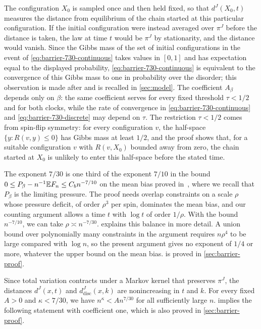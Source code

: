 The configuration $X_0$ is sampled once and then held fixed, so that
$d^J(X_0,t)$ measures the distance from equilibrium of the chain started at
this particular configuration. If the initial configuration were instead
averaged over $\pi^J$ before the distance is taken, the law at time $t$
would be $\pi^J$ by stationarity, and the distance would vanish. Since the
Gibbs mass of the set of initial configurations in the event of
\eqref{eq:barrier-730-continuous} takes values in $[0,1]$ and has expectation
equal to the displayed probability, \eqref{eq:barrier-730-continuous} is
equivalent to the convergence of this Gibbs mass to one in probability over
the disorder; this observation is made after
\cite[Theorem~1.1]{oai-barriers} and is recalled in \cref{sec:model}. The
coefficient $A_\beta$ depends only on $\beta$: the same coefficient serves
for every fixed threshold $\tau<1/2$ and for both clocks, while the rate of
convergence in \eqref{eq:barrier-730-continuous} and
\eqref{eq:barrier-730-discrete} may depend on $\tau$. The restriction
$\tau<1/2$ comes from spin-flip symmetry: for every configuration $v$, the
half-space $\{y:R(v,y)\le0\}$ has Gibbs mass at least $1/2$, and the proof
shows that, for a suitable configuration $v$ with $R(v,X_0)$ bounded away
from zero, the chain started at $X_0$ is unlikely to enter this half-space
before the stated time.

The exponent $7/30$ is one third of the exponent $7/10$ in the bound
$0\le P_\beta-n^{-1}\mathbb E F_n\le C_b n^{-7/10}$ on the mean bias
proved in~\cite[Theorem~1.1]{hexagon-bias}, where
we recall that $P_\beta$ is the limiting pressure. The proof needs overlap constraints on a scale
$\rho$ whose pressure deficit, of order $\rho^3$ per spin, dominates the
mean bias, and our counting argument allows a time $t$ with $\log t$ of
order $1/\rho$. With the bound $n^{-7/10}$, we can take
$\rho\asymp n^{-7/30}$.  explains this balance in
more detail. A union bound over polynomially many constraints in the
argument requires $n\rho^4$ to be large compared with $\log n$, so the
present argument gives no exponent of $1/4$ or more, whatever the upper
bound on the mean bias.  is proved in
\cref{sec:barrier-proof}.

Since total variation contracts under a Markov kernel that preserves
$\pi^J$, the distances $d^J(x,t)$ and $d^J_{\mathrm{disc}}(x,k)$ are
nonincreasing in $t$ and $k$. For every fixed $A>0$ and $\kappa<7/30$, we
have $n^\kappa<An^{7/30}$ for all sufficiently large $n$.
 implies the following statement with
coefficient one, which is also proved in \cref{sec:barrier-proof}.

